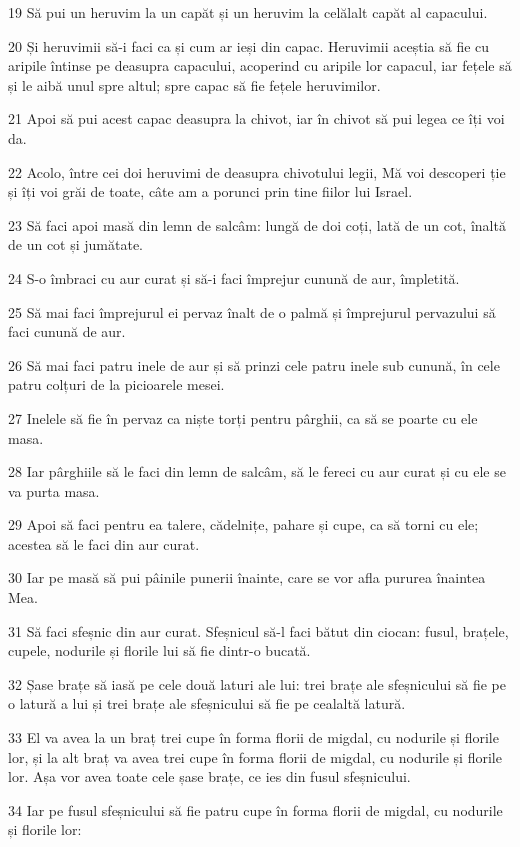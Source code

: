 \par 19 Să pui un heruvim la un capăt și un heruvim la celălalt capăt al capacului.
\par 20 Și heruvimii să-i faci ca și cum ar ieși din capac. Heruvimii aceștia să fie cu aripile întinse pe deasupra capacului, acoperind cu aripile lor capacul, iar fețele să și le aibă unul spre altul; spre capac să fie fețele heruvimilor.
\par 21 Apoi să pui acest capac deasupra la chivot, iar în chivot să pui legea ce îți voi da.
\par 22 Acolo, între cei doi heruvimi de deasupra chivotului legii, Mă voi descoperi ție și îți voi grăi de toate, câte am a porunci prin tine fiilor lui Israel.
\par 23 Să faci apoi masă din lemn de salcâm: lungă de doi coți, lată de un cot, înaltă de un cot și jumătate.
\par 24 S-o îmbraci cu aur curat și să-i faci împrejur cunună de aur, împletită.
\par 25 Să mai faci împrejurul ei pervaz înalt de o palmă și împrejurul pervazului să faci cunună de aur.
\par 26 Să mai faci patru inele de aur și să prinzi cele patru inele sub cunună, în cele patru colțuri de la picioarele mesei.
\par 27 Inelele să fie în pervaz ca niște torți pentru pârghii, ca să se poarte cu ele masa.
\par 28 Iar pârghiile să le faci din lemn de salcâm, să le fereci cu aur curat și cu ele se va purta masa.
\par 29 Apoi să faci pentru ea talere, cădelnițe, pahare și cupe, ca să torni cu ele; acestea să le faci din aur curat.
\par 30 Iar pe masă să pui pâinile punerii înainte, care se vor afla pururea înaintea Mea.
\par 31 Să faci sfeșnic din aur curat. Sfeșnicul să-l faci bătut din ciocan: fusul, brațele, cupele, nodurile și florile lui să fie dintr-o bucată.
\par 32 Șase brațe să iasă pe cele două laturi ale lui: trei brațe ale sfeșnicului să fie pe o latură a lui și trei brațe ale sfeșnicului să fie pe cealaltă latură.
\par 33 El va avea la un braț trei cupe în forma florii de migdal, cu nodurile și florile lor, și la alt braț va avea trei cupe în forma florii de migdal, cu nodurile și florile lor. Așa vor avea toate cele șase brațe, ce ies din fusul sfeșnicului.
\par 34 Iar pe fusul sfeșnicului să fie patru cupe în forma florii de migdal, cu nodurile și florile lor:

